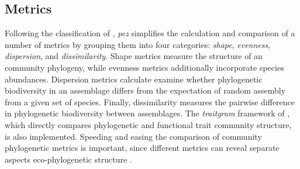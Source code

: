 \documentclass{bioinfo}
\begin{document}
\subsection{Metrics}
Following the classification of \citet{Pearse2014review}, \emph{pez}
simplifies the calculation and comparison of a number of metrics by
grouping them into four categories: \emph{shape}, \emph{evenness},
\emph{dispersion}, and \emph{dissimilarity}. Shape metrics measure the
structure of an community phylogeny, while evenness metrics
additionally incorporate species abundances. Dispersion metrics
calculate examine whether phylogenetic biodiversity in an assemblage
differs from the expectation of random assembly from a given set of
species. Finally, dissimilarity measures the pairwise difference in
phylogenetic biodiversity between assemblages. The \emph{traitgram}
framework of \citet{Cadotte2013}, which directly compares phylogenetic
and functional trait community structure, is also
implemented. Speeding and easing the comparison of community
phylogenetic metrics is important, since different metrics can reveal
separate aspects eco-phylogenetic structure \citep{Cadotte2010}.
\end{document}
